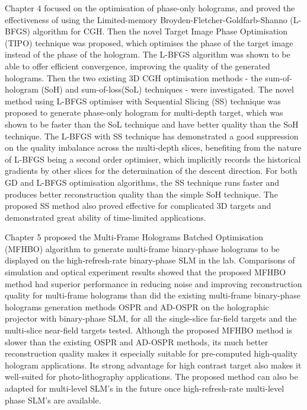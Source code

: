 Chapter 4 focused on the optimisation of phase-only holograms, and proved the effectiveness of using the Limited-memory Broyden-Fletcher-Goldfarb-Shanno (L-BFGS) algorithm for CGH. Then the novel Target Image Phase Optimisation (TIPO) technique was proposed, which optimises the phase of the target image instead of the phase of the hologram. The L-BFGS algorithm was shown to be able to offer efficient convergence, improving the quality of the generated holograms. Then the two existing 3D CGH optimisation methods - the sum-of-hologram (SoH) and sum-of-loss(SoL) techniques - were investigated. The novel method using L-BFGS optimiser with Sequential Slicing (SS) technique was proposed to generate phase-only hologram for multi-depth target, which was shown to be faster than the SoL technique and have better quality than the SoH technique. The L-BFGS with SS technique has demonstrated a good suppression on the quality imbalance across the multi-depth slices, benefiting from the nature of L-BFGS being a second order optimiser, which implicitly records the historical gradients by other slices for the determination of the descent direction. For both GD and L-BFGS optimisation algorithms, the SS technique runs faster and produces better reconstruction quality than the simple SoH technique. The proposed SS method also proved effective for complicated 3D targets and demonstrated great ability of time-limited applications.

Chapter 5 proposed the Multi-Frame Holograms Batched Optimisation (MFHBO) algorithm to generate multi-frame binary-phase holograms to be displayed on the high-refresh-rate binary-phase SLM in the lab. Comparisons of simulation and optical experiment results showed that the proposed MFHBO method had superior performance in reducing noise and improving reconstruction quality for multi-frame holograms than did the existing multi-frame binary-phase holograms generation methods OSPR and AD-OSPR on the holographic projector with binary-phase SLM, for all the single-slice far-field targets and the multi-slice near-field targets tested. Although the proposed MFHBO method is slower than the existing OSPR and AD-OSPR methods, its much better reconstruction quality makes it especially suitable for pre-computed high-quality hologram applications. Its strong advantage for high contrast target also makes it well-suited for photo-lithography applications. The proposed method can also be adapted for multi-level SLM's in the future once high-refresh-rate multi-level phase SLM's are available.

